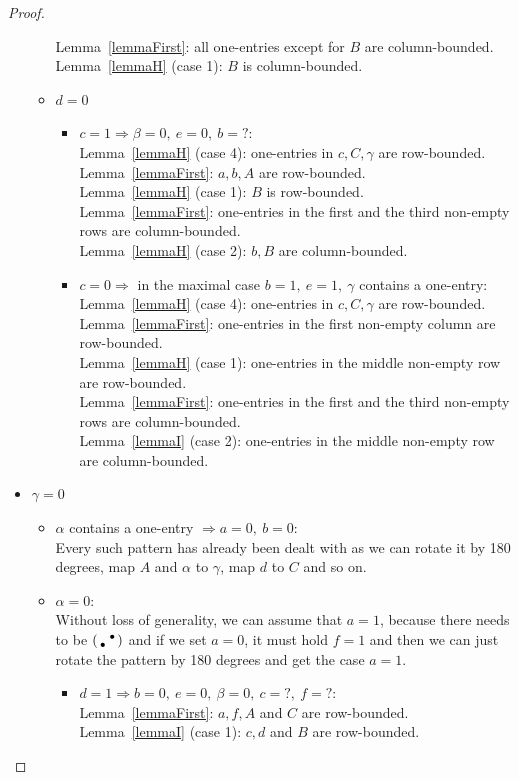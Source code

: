 \begin{proof}
\begin{itemize}
\begin{itemize}
				Lemma~\ref{lemmaFirst}: all one-entries except for $B$ are column-bounded.\\
				Lemma~\ref{lemmaH} (case 1): $B$ is column-bounded.
			\item $d=0$
				\begin{itemize}
					\item $c=1\Rightarrow\beta=0,\ e=0,\ b=?$:\\
						Lemma~\ref{lemmaH} (case 4): one-entries in $c,C,\gamma$ are row-bounded.\\
						Lemma~\ref{lemmaFirst}: $a,b,A$ are row-bounded.\\
						Lemma~\ref{lemmaH} (case 1): $B$ is row-bounded.\\
						
						Lemma~\ref{lemmaFirst}: one-entries in the first and the third non-empty rows are column-bounded.\\
						Lemma~\ref{lemmaH} (case 2): $b,B$ are column-bounded.
					\item $c=0\Rightarrow$ in the maximal case $b=1,\ e=1,\ \gamma$ contains a one-entry:\\
						Lemma~\ref{lemmaH} (case 4): one-entries in $c,C,\gamma$ are row-bounded.\\
						Lemma~\ref{lemmaFirst}: one-entries in the first non-empty column are row-bounded.\\
						Lemma~\ref{lemmaH} (case 1): one-entries in the middle non-empty row are row-bounded.\\
						
						Lemma~\ref{lemmaFirst}: one-entries in the first and the third non-empty rows are column-bounded.\\
						Lemma~\ref{lemmaI} (case 2): one-entries in the middle non-empty row are column-bounded.
				\end{itemize}
		\end{itemize}
	\item $\gamma=0$
		\begin{itemize}
			\item $\alpha$ contains a one-entry $\Rightarrow a=0,\ b=0$:\\
				Every such pattern has already been dealt with as we can rotate it by 180 degrees, map $A$ and $\alpha$ to $\gamma$, map $d$ to $C$ and so on.
			\item $\alpha=0$:\\
				Without loss of generality, we can assume that $a=1$, because there needs to be $\left(\begin{smallmatrix} &\bullet\\\bullet& \end{smallmatrix}\right)$ and if we set $a=0$, it must hold $f=1$ and then we can just rotate the pattern by 180 degrees and get the case $a=1$.
				\begin{itemize}
					\item $d=1\Rightarrow b=0,\ e=0,\ \beta=0,\ c=?,\ f=?$:\\
						Lemma~\ref{lemmaFirst}: $a,f,A$ and $C$ are row-bounded.\\
						Lemma~\ref{lemmaI} (case 1): $c,d$ and $B$ are row-bounded.\\
						

\end{itemize}
\end{itemize}
\end{itemize}
\end{proof}
